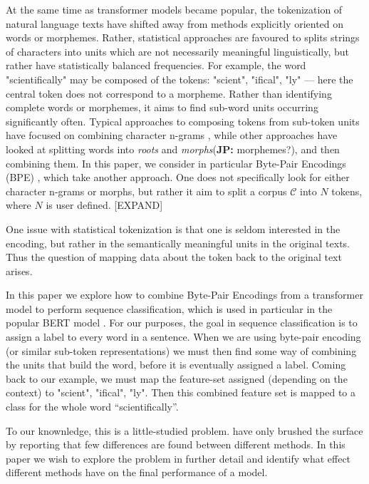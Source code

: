 \documentclass[11pt]{article}
\newcommand\jp[1]{(\textbf{JP:} #1)}
\begin{document}
	At the same time as transformer models became popular, the
        tokenization of natural language texts have shifted away from
        methods explicitly oriented on words or morphemes. Rather,
        statistical approaches are favoured to splits strings of
        characters into units which are not necessarily meaningful
        linguistically, but rather have statistically balanced
        frequencies. For example, the word "scientifically" may be
        composed of the tokens: "scient", "ifical", "ly" --- here the
        central token does not correspond to a morpheme.
        Rather than identifying complete words or morphemes, it aims
        to find sub-word units occurring significantly often. Typical
        approaches to composing tokens from sub-token units have
        focused on combining character n-grams \cite{TODO:bojanowski},
        while other approaches have looked at splitting words into
        \textit{roots} and \textit{morphs}\jp{morphemes?}, and then
        combining them. In this paper, we consider in particular
        Byte-Pair Encodings (BPE) \citep{sennrich2015neural}, which take another approach. One does not
        specifically look for either character n-grams or morphs, but
        rather it aim to split a corpus $\mathcal{C}$ into $N$ tokens,
        where $N$ is user defined. [EXPAND]

        One issue with statistical tokenization is that one is seldom
        interested in the encoding, but rather in the semantically
        meaningful units in the original texts. Thus the question of
        mapping data about the token back to the original text arises.

	In this paper we explore how to combine Byte-Pair Encodings
        from a transformer model to perform sequence
        classification, which is used in particular in the popular BERT model \citep{devlin2018bert}. For our purposes, the goal in sequence
        classification is to assign a label to every word in a
        sentence. When we are using byte-pair encoding (or similar
        sub-token representations) we must then find some way of
        combining the units that build the word, before it is
        eventually assigned a label. Coming back to our example, we
        must map the feature-set assigned (depending on the context)
        to "scient", "ifical", "ly". Then this combined feature set is
        mapped to a class for the whole word ``scientifically''.

	To our knownledge, this is a little-studied
        problem. \citet{todo} have only brushed the surface by
        reporting that few differences are found between different
        methods. In this paper we wish to explore the problem in
        further detail and identify what effect different methods have
        on the final performance of a model.
\end{document}
